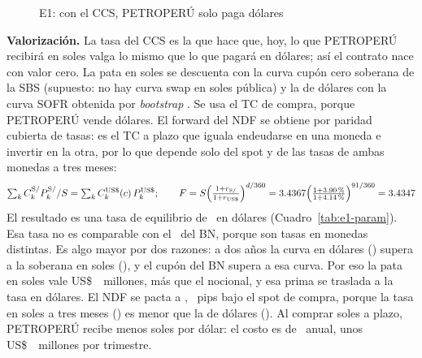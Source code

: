 \begin{figure}[t]\centering\small
{}
\caption{E1: con el CCS, PETROPERÚ solo paga dólares}\label{fig:ccs}
\end{figure}

\textbf{Valorización.} La tasa del CCS es la que hace que, hoy, lo que PETROPERÚ recibirá en soles valga lo mismo que
lo que pagará en dólares; así el contrato nace con valor cero. La pata en soles se descuenta con la curva cupón cero
soberana de la SBS (supuesto: no hay curva swap en soles pública) y la de dólares con la curva SOFR obtenida por
\emph{bootstrap} \parencite{sbs2026curvas,bluegamma2026,hull2022}. Se usa el TC de compra, porque PETROPERÚ vende
dólares. El forward del NDF se obtiene por paridad cubierta de tasas: es el TC a plazo que iguala endeudarse en
una moneda e invertir en la otra, por lo que depende solo del spot y de las tasas de ambas monedas a tres meses:
\[\textstyle\sum_k C^{\text{S/}}_k P^{\text{S/}}_k/S=\sum_k C^{\text{US\$}}_k(c)\,P^{\text{US\$}}_k;\qquad
F=S\Big(\frac{1+r_{\text{S/}}}{1+r_{\text{US\$}}}\Big)^{d/360}=3.4367\Big(\frac{1+\text{3.90\,\%}}{1+\text{4.14\,\%}}\Big)^{91/360}=3.4347\]
El resultado es una tasa de equilibrio de \CCSTasaUSD\ en dólares (Cuadro~\ref{tab:e1-param}). Esa tasa no es
comparable con el \BNTasa\ del BN, porque son tasas en monedas distintas. Es algo mayor por dos razones: a dos años la
curva en dólares (\USDDosAnios) supera a la soberana en soles (\PENDosAnios), y el cupón del BN supera a esa curva. Por
eso la pata en soles vale US\$~\CCSVPPataPEN\ millones, más que el nocional, y esa prima se traslada a la tasa en
dólares. El NDF se pacta a \NDFForward, \NDFPuntosAbs~pips bajo el spot de compra, porque la tasa en soles a tres meses
(\PENTresMeses) es menor que la de dólares (\USDTresMeses). Al comprar soles a plazo, PETROPERÚ recibe menos soles por
dólar: el costo es de \NDFCostoAnual\ anual, unos US\$~\NDFCostoUSD\ millones por trimestre.


